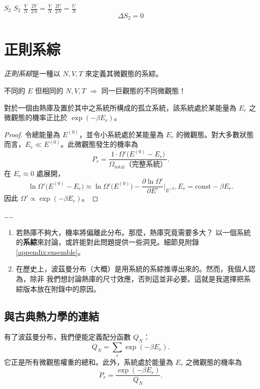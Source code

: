  $S_2$ 
 $S_2$  $\frac{V}{N}$ $\frac{2V}{2N} = \frac{V}{N}$  $\frac{2U}{2N} = \frac{U}{N}$ 
\[ \Delta S_{2} = 0 \]

\section{正則系綜}
\begin{definition}
\emph{正則系綜}是一種以 $N,V,T$ 來定義其微觀態的系綜。
\end{definition}

不同的 $E$ 但相同的 $N,V,T$ $\Longrightarrow$ 同一巨觀態的不同微觀態！

\begin{theorem}
對於一個由熱庫及置於其中之系統所構成的孤立系統，該系統處於某能量為 $E_r$ 之微觀態的機率正比於 $\exp(-\beta E_r)$。
\end{theorem}

\begin{proof}
令總能量為 $E^{(0)}$，並令小系統處於某能量為 $E_r$ 的微觀態。對大多數狀態而言，$E_r \ll E^{(0)}$。此微觀態發生的機率為
\[
    P_r = \frac{1\cdot\Omega'\!\bigl(E^{(0)} - E_r\bigr)}{\Omega_{\mathrm{total}}\text{（完整系統）}}.
\]
在 $E_r \approx 0$ 處展開，
\[
    \ln\Omega'\!\bigl(E^{(0)} - E_r\bigr)
    \approx \ln\Omega'\!\bigl(E^{(0)}\bigr)
    - \frac{\partial\ln\Omega'}{\partial E'}\bigg|_{E^{(0)}}\!E_r
    = \mathrm{const} - \beta E_r.
\]
因此 $\Omega' \propto \exp(-\beta E_r)$。
\end{proof}

\begin{remark}
    ……
    \begin{enumerate}
        \item 若熱庫不夠大，機率將偏離此分布。那麼，熱庫究竟需要多大？
        以一個系統的\textbf{系綜}來討論，或許能對此問題提供一些洞見。細節見附錄 \ref{appendix:ensemble}。
        \item 在歷史上，波茲曼分布（大概）是用系統的系綜推導出來的。然而，我個人認為，除非
        我們想討論熱庫的尺寸效應，否則這並非必要。這就是我選擇把系綜版本放在附錄中的原因。
    \end{enumerate}
\end{remark}

\subsection{與古典熱力學的連結}
有了波茲曼分布，我們便能定義配分函數 $Q_N$：
\[
    Q_N = \sum_r \exp(-\beta E_r).
\]
它正是所有微觀態權重的總和。此外，系統處於能量為 $E_r$ 之微觀態的機率為
\[
    P_r = \frac{\exp(-\beta E_r)}{Q_N}.
\]

